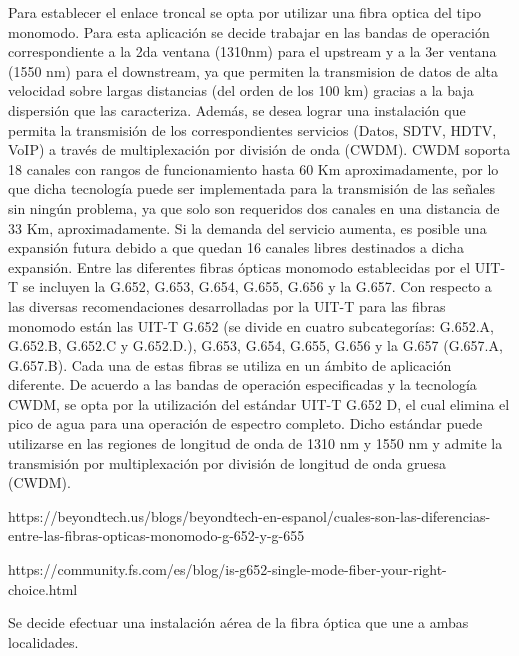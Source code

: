 Para establecer el enlace troncal se opta por utilizar una fibra optica del tipo monomodo. Para esta aplicación se decide trabajar en las bandas de operación correspondiente a la 2da ventana (1310nm) para el upstream y a la 3er ventana (1550 nm) para el downstream, ya que permiten la transmision de datos de alta velocidad sobre largas distancias (del orden de los 100 km) gracias a la baja dispersión que las caracteriza. 
Además, se desea lograr una instalación que permita la transmisión de los correspondientes servicios (Datos, SDTV, HDTV, VoIP) a través de multiplexación por división de onda (CWDM). CWDM soporta 18 canales con rangos de funcionamiento hasta 60 Km aproximadamente, por lo que dicha tecnología puede ser implementada para la transmisión de las señales sin ningún problema, ya que solo son requeridos dos canales en una distancia de 33 Km, aproximadamente. Si la demanda del servicio aumenta, es posible una expansión futura  debido a que quedan 16 canales libres destinados a dicha expansión.
Entre las diferentes fibras ópticas monomodo establecidas por el UIT-T se incluyen la G.652, G.653, G.654, G.655, G.656 y la G.657.
Con respecto a las diversas recomendaciones desarrolladas por la UIT-T para las fibras monomodo están las UIT-T G.652 (se divide en cuatro subcategorías: G.652.A, G.652.B, G.652.C y G.652.D.), G.653, G.654, G.655, G.656 y la G.657 (G.657.A, G.657.B). Cada una de estas fibras se utiliza en un ámbito de aplicación diferente.
De acuerdo a las bandas de operación especificadas y la tecnología CWDM, se opta por la utilización del estándar UIT-T G.652 D, el cual elimina el pico de agua para una operación de espectro completo. Dicho estándar puede utilizarse en las regiones de longitud de onda de 1310 nm y 1550 nm y admite la transmisión por multiplexación por división de longitud de onda gruesa (CWDM).


https://beyondtech.us/blogs/beyondtech-en-espanol/cuales-son-las-diferencias-entre-las-fibras-opticas-monomodo-g-652-y-g-655

https://community.fs.com/es/blog/is-g652-single-mode-fiber-your-right-choice.html




Se decide efectuar una instalación aérea de la fibra óptica que une a ambas localidades.
 
